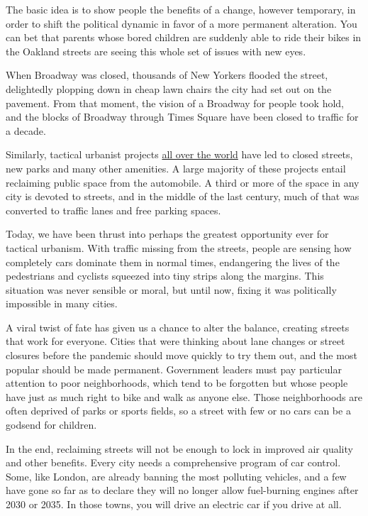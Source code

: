 The basic idea is to show people the benefits of a change, however
temporary, in order to shift the political dynamic in favor of a more
permanent alteration. You can bet that parents whose bored children are
suddenly able to ride their bikes in the Oakland streets are seeing this
whole set of issues with new eyes.

When Broadway was closed, thousands of New Yorkers flooded the street,
delightedly plopping down in cheap lawn chairs the city had set out on
the pavement. From that moment, the vision of a Broadway for people took
hold, and the blocks of Broadway through Times Square have been closed
to traffic for a decade.

Similarly, tactical urbanist projects
\href{https://www.itdp.org/event/power-of-tactical-urbanism/https:/www.itdp.org/event/power-of-tactical-urbanism/}{all
over the world} have led to closed streets, new parks and many other
amenities. A large majority of these projects entail reclaiming public
space from the automobile. A third or more of the space in any city is
devoted to streets, and in the middle of the last century, much of that
was converted to traffic lanes and free parking spaces.

Today, we have been thrust into perhaps the greatest opportunity ever
for tactical urbanism. With traffic missing from the streets, people are
sensing how completely cars dominate them in normal times, endangering
the lives of the pedestrians and cyclists squeezed into tiny strips
along the margins. This situation was never sensible or moral, but until
now, fixing it was politically impossible in many cities.

A viral twist of fate has given us a chance to alter the balance,
creating streets that work for everyone. Cities that were thinking about
lane changes or street closures before the pandemic should move quickly
to try them out, and the most popular should be made permanent.
Government leaders must pay particular attention to poor neighborhoods,
which tend to be forgotten but whose people have just as much right to
bike and walk as anyone else. Those neighborhoods are often deprived of
parks or sports fields, so a street with few or no cars can be a godsend
for children.

In the end, reclaiming streets will not be enough to lock in improved
air quality and other benefits. Every city needs a comprehensive program
of car control. Some, like London, are already banning the most
polluting vehicles, and a few have gone so far as to declare they will
no longer allow fuel-burning engines after 2030 or 2035. In those towns,
you will drive an electric car if you drive at all.

